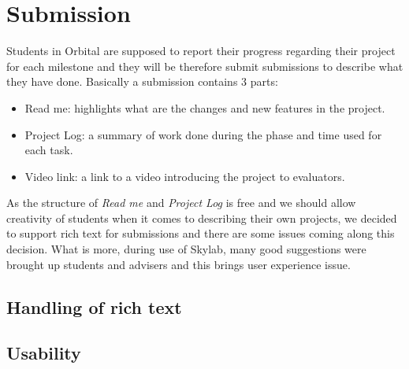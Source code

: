 \chapter{Submission}

Students in Orbital are supposed to report their progress regarding their project for each milestone and they will be therefore submit submissions to describe what they have done. Basically a submission contains 3 parts:

\begin{itemize}
  \item Read me: highlights what are the changes and new features in the project.
  \item Project Log: a summary of work done during the phase and time used for each task.
  \item Video link: a link to a video introducing the project to evaluators.
\end{itemize}

As the structure of \textit{Read me} and \textit{Project Log} is free and we should allow creativity of students when it comes to describing their own projects, we decided to support rich text for submissions and there are some issues coming along this decision. What is more, during use of Skylab, many good suggestions were brought up students and advisers and this brings user experience issue.

\section{Handling of rich text}

\section{Usability}
